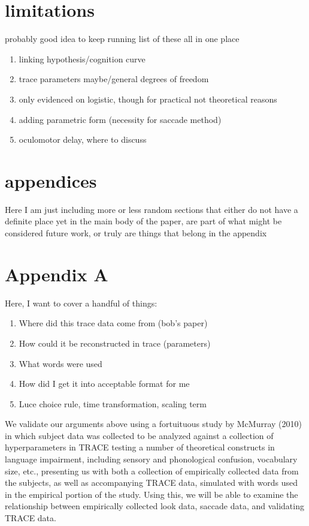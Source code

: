 \documentclass{article}
\begin{document}
\section{limitations}

probably good idea to keep running list of these all in one place

\begin{enumerate}
\item linking hypothesis/cognition curve
\item trace parameters maybe/general degrees of freedom
\item only evidenced on logistic, though for practical not theoretical reasons
\item adding parametric form (necessity for saccade method)
\item oculomotor delay, where to discuss
\end{enumerate}


\section{appendices}

Here  I am just including more or less random sections that either do not have a definite place yet in the main body of the paper, are part of what might be considered future work, or truly are things that belong in the appendix

\section*{Appendix A}



Here, I want to cover a handful of things:

\begin{enumerate}
\item Where did this trace data come from (bob's paper)
\item How could it be reconstructed in trace (parameters)
\item What words were used
\item How did I get it into acceptable format for me
\item Luce choice rule, time transformation, scaling term
\end{enumerate}

We validate our arguments above using a fortuituous study by McMurray (2010) in which subject data was collected to be analyzed against a collection of hyperparameters in TRACE testing a number of theoretical constructs in language impairment, including sensory and phonological confusion, vocabulary size, etc., presenting us with both a collection of empirically collected data from the subjects, as well as accompanying TRACE data, simulated with words used in the empirical portion of the study. Using this, we will be able to examine the relationship between empirically collected look data, saccade data, and validating TRACE data.
\end{document}

